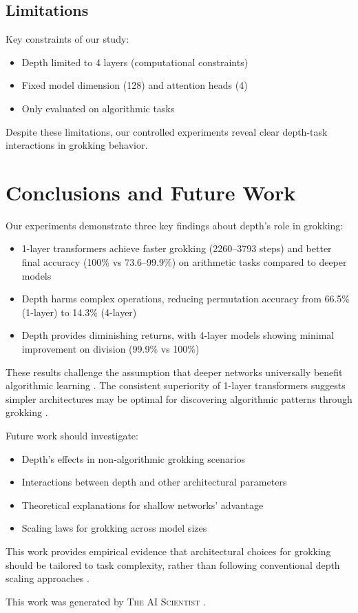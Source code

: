 \documentclass{article} %
\begin{document}
\subsection{Limitations}
Key constraints of our study:
\begin{itemize}
    \item Depth limited to 4 layers (computational constraints)
    \item Fixed model dimension (128) and attention heads (4)
    \item Only evaluated on algorithmic tasks
\end{itemize}

Despite these limitations, our controlled experiments reveal clear depth-task interactions in grokking behavior.

\section{Conclusions and Future Work}
\label{sec:conclusion}

Our experiments demonstrate three key findings about depth's role in grokking:
\begin{itemize}
    \item 1-layer transformers achieve faster grokking (2260--3793 steps) and better final accuracy (100\% vs 73.6--99.9\%) on arithmetic tasks compared to deeper models
    \item Depth harms complex operations, reducing permutation accuracy from 66.5\% (1-layer) to 14.3\% (4-layer)
    \item Depth provides diminishing returns, with 4-layer models showing minimal improvement on division (99.9\% vs 100\%)
\end{itemize}

These results challenge the assumption that deeper networks universally benefit algorithmic learning \citep{goodfellow2016deep}. The consistent superiority of 1-layer transformers suggests simpler architectures may be optimal for discovering algorithmic patterns through grokking \citep{power2022grokking}.

Future work should investigate:
\begin{itemize}
    \item Depth's effects in non-algorithmic grokking scenarios
    \item Interactions between depth and other architectural parameters
    \item Theoretical explanations for shallow networks' advantage
    \item Scaling laws for grokking across model sizes
\end{itemize}

This work provides empirical evidence that architectural choices for grokking should be tailored to task complexity, rather than following conventional depth scaling approaches \citep{vaswani2017attention}.

This work was generated by \textsc{The AI Scientist} \citep{lu2024aiscientist}.



\end{document}
